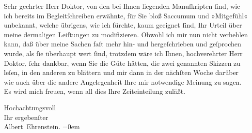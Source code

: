 \pstart{}Sehr geehrter Herr Doktor,\pend\vspace{0.5em}
\pstart
           von den bei Ihnen liegenden Manuſkripten{ }ſind, wie ich bereits im Begleitſchreiben
               erwähnte, für Sie bloß Saccumum und »Mitgefühl« unbekannt, welche übrigens, wie ich
               fürchte, kaum geeignet{ }ſind, Ihr Urteil über meine dermaligen Leiſtungen zu
               modifizieren. Obwohl ich mir nun nicht verhehlen kann, daß über meine Sachen faſt
               mehr hin- und hergeſchrieben und geſprochen wurde, als {\pb}ſie überhaupt wert{ }ſind, trotzdem wäre ich
               Ihnen, hochverehrter Herr Doktor,{ }ſehr dankbar, wenn Sie die Güte hätten, die zwei
               genannten Skizzen zu
               leſen, in den anderen zu blättern und mir dann in der nächſten Woche darüber wie auch
               über die andere Angelegenheit Ihre mir notwendige Meinung zu sagen. Es wird mich
               freuen, wenn all dies Ihre Zeiteinteilung zuläßt.\pend
           
\pstart
           Hochachtungsvoll{\\[\baselineskip]}Ihr ergebenſter{\\[\baselineskip]}\spacefill\mbox{Albert Ehrenstein.}\pend
           \leftskip=0em{}\endnumbering{}  \newcommand{\dateiname}{L01889}\newcommand{\titel}{Albert Ehrenstein an Arthur Schnitzler, 25. 11. 1909}\newcommand{\editorInnen}{Martin Anton Müller und Gerd-Hermann Susen}
